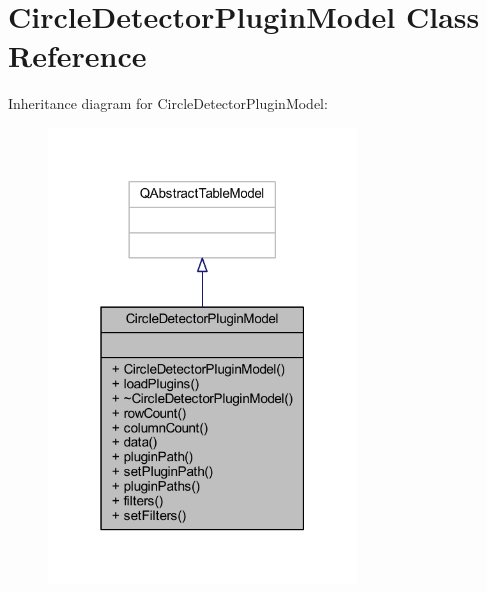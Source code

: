 \hypertarget{class_circle_detector_plugin_model}{}\section{Circle\+Detector\+Plugin\+Model Class Reference}
\label{class_circle_detector_plugin_model}


Inheritance diagram for Circle\+Detector\+Plugin\+Model\+:\nopagebreak
\begin{figure}[H]
\begin{center}
\leavevmode
\includegraphics[width=232pt]{df/de3/class_circle_detector_plugin_model__inherit__graph}
\end{center}
\end{figure}



